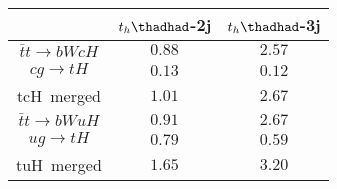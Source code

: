 
\centering
\begin{tabular}{ccc} \toprule\toprule
& $t_{h}\thadhad$-2j & $t_{h}\thadhad$-3j\\\midrule
$\bar{t}t\to bWcH$ & $0.88$ & $2.57$ \\
$cg\to tH$ &  $0.13$        & $0.12$ \\
tcH~merged &  $1.01$        & $2.67$  \\
$\bar{t}t\to bWuH$ & $0.91$ & $2.67$   \\
$ug\to tH$ & $0.79$         & $0.59$   \\
tuH~merged & $1.65$         & $3.20$   \\
\bottomrule\bottomrule
\end{tabular}

